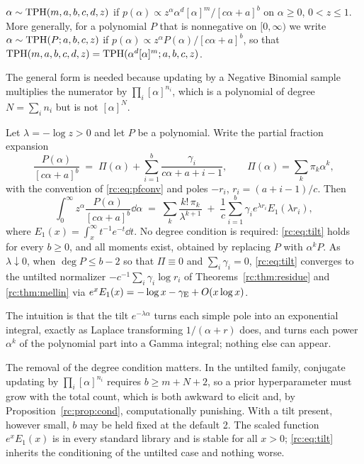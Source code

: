 \begin{definition}\label{rc:def:tph}
$\alpha\sim\mathrm{TPH}(m,a,b,c,d,z)$ if $p(\alpha)\propto z^\alpha\alpha^d[\alpha]^m/[c\alpha+a]^b$ on $\alpha\ge0$, $0<z\le1$. More generally, for a polynomial $P$ that is nonnegative on $[0,\infty)$ we write $\alpha\sim\mathrm{TPH}(P;a,b,c,z)$ if $p(\alpha)\propto z^\alpha P(\alpha)/[c\alpha+a]^b$, so that $\mathrm{TPH}(m,a,b,c,d,z)=\mathrm{TPH}(\alpha^d[\alpha]^m;a,b,c,z)$.
\end{definition}

The general form is needed because updating by a Negative Binomial sample multiplies the numerator by $\prod_i[\alpha]^{n_i}$, which is a polynomial of degree $N=\sum_in_i$ but is not $[\alpha]^N$.

\begin{theorem}\label{rc:thm:tilt}
Let $\lambda=-\log z>0$ and let $P$ be a polynomial. Write the partial fraction expansion
\[
\frac{P(\alpha)}{[c\alpha+a]^b}\;=\;\Pi(\alpha)+\sum_{i=1}^b\frac{\gamma_i}{c\alpha+a+i-1},\qquad\Pi(\alpha)=\sum_k\pi_k\alpha^k,
\]
with the convention of \eqref{rc:eq:pfconv} and poles $-r_i$, $r_i=(a+i-1)/c$. Then
\begin{equation}\label{rc:eq:tilt}
\int_0^\infty z^\alpha\frac{P(\alpha)}{[c\alpha+a]^b}\dd\alpha\;=\;\sum_k\frac{k!\,\pi_k}{\lambda^{k+1}}\;+\;\frac1c\sum_{i=1}^b\gamma_ie^{\lambda r_i}E_1(\lambda r_i),
\end{equation}
where $E_1(x)=\int_x^\infty t^{-1}e^{-t}\dd t$. No degree condition is required: \eqref{rc:eq:tilt} holds for every $b\ge0$, and all moments exist, obtained by replacing $P$ with $\alpha^kP$. As $\lambda\downarrow0$, when $\deg P\le b-2$ so that $\Pi\equiv0$ and $\sum_i\gamma_i=0$, \eqref{rc:eq:tilt} converges to the untilted normalizer $-c^{-1}\sum_i\gamma_i\log r_i$ of Theorems~\ref{rc:thm:residue} and \ref{rc:thm:mellin} via $e^xE_1(x)=-\log x-\gamma_{\mathrm{E}}+O(x\log x)$.
\end{theorem}

The intuition is that the tilt $e^{-\lambda\alpha}$ turns each simple pole into an exponential integral, exactly as Laplace transforming $1/(\alpha+r)$ does, and turns each power $\alpha^k$ of the polynomial part into a Gamma integral; nothing else can appear.

The removal of the degree condition matters. In the untilted family, conjugate updating by $\prod_i[\alpha]^{n_i}$ requires $b\ge m+N+2$, so a prior hyperparameter must grow with the total count, which is both awkward to elicit and, by Proposition~\ref{rc:prop:cond}, computationally punishing. With a tilt present, however small, $b$ may be held fixed at the default 2. The scaled function $e^xE_1(x)$ is in every standard library and is stable for all $x>0$; \eqref{rc:eq:tilt} inherits the conditioning of the untilted case and nothing worse.

